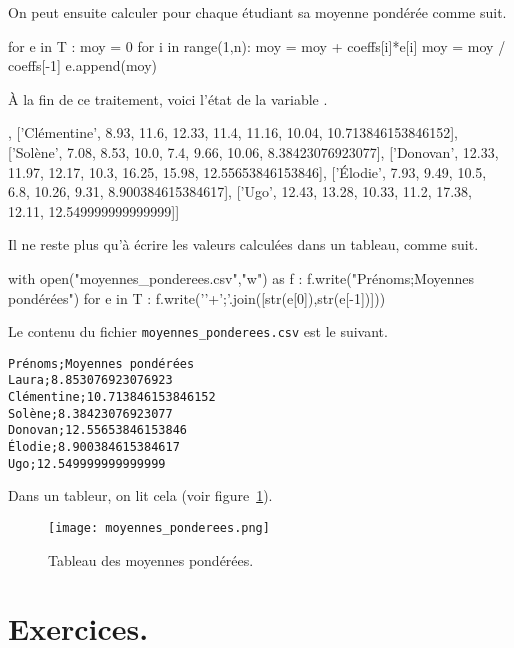 On peut ensuite calculer pour chaque étudiant sa moyenne pondérée comme suit. 
\begin{pyverbatim}
for e in T : 
    moy = 0
    for i in range(1,n):
        moy = moy + coeffs[i]*e[i]
    moy = moy / coeffs[-1]
    e.append(moy)
\end{pyverbatim}
À la fin de ce traitement, voici l'état de la variable .
\begin{pyverbatim}
[['Laura', 8.15, 9.84, 11.0, 5.5, 10.64, 7.16, 8.853076923076923], 
 ['Clémentine', 8.93, 11.6, 12.33, 11.4, 11.16, 10.04, 10.713846153846152], 
 ['Solène', 7.08, 8.53, 10.0, 7.4, 9.66, 10.06, 8.38423076923077], 
 ['Donovan', 12.33, 11.97, 12.17, 10.3, 16.25, 15.98, 12.55653846153846], 
 ['Élodie', 7.93, 9.49, 10.5, 6.8, 10.26, 9.31, 8.900384615384617], 
 ['Ugo', 12.43, 13.28, 10.33, 11.2, 17.38, 12.11, 12.549999999999999]]
\end{pyverbatim}

Il ne reste plus qu'à écrire les valeurs calculées dans un tableau, comme suit. 
\begin{pyverbatim}
with open("moyennes_ponderees.csv","w") as f : 
    f.write("Prénoms;Moyennes pondérées")
    for e in T : 
        f.write('\n'+';'.join([str(e[0]),str(e[-1])]))
\end{pyverbatim}
Le contenu du fichier \texttt{moyennes\_ponderees.csv} est le suivant. 
\begin{verbatim}
Prénoms;Moyennes pondérées
Laura;8.853076923076923
Clémentine;10.713846153846152
Solène;8.38423076923077
Donovan;12.55653846153846
Élodie;8.900384615384617
Ugo;12.549999999999999
\end{verbatim}
Dans un tableur, on lit cela (voir figure~\ref{07:tab:moyennes_ponderees}).
\begin{figure}[h!]
    \begin{center}
        \texttt{[image: moyennes\_ponderees.png]}
    \end{center}
    \caption{Tableau des moyennes pondérées.}
    \label{07:tab:moyennes_ponderees}
\end{figure}
\section{Exercices.}

%  

%  

%  


% 
% 

